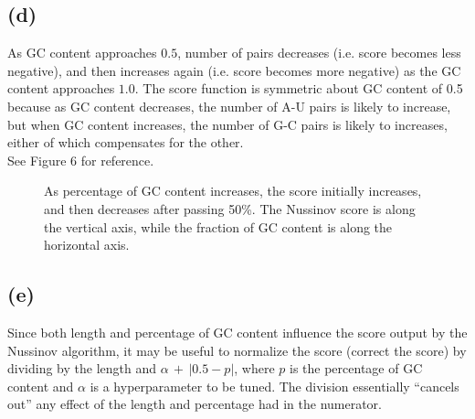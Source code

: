 \documentclass[11pt]{article}
\begin{document}
\subsection*{(d)}
As GC content approaches $0.5$, number of pairs decreases (i.e. score
becomes less negative), and then increases again (i.e. score becomes
more negative) as the GC content approaches $1.0$. The score function
is symmetric about GC content of 0.5 because as GC content decreases,
the number of A-U pairs is likely to increase, but when GC content
increases, the number of G-C pairs is likely to increases, either
of which compensates for the other.\\

\noindent See Figure 6 for reference.

\begin{figure}[h]
\noindent{}
\caption{As percentage of GC content increases, the score initially
increases, and then decreases after passing 50\%. The Nussinov
score is along the vertical axis, while the fraction of
GC content is along the horizontal axis.}
\end{figure}

\subsection*{(e)}

Since both length and percentage of GC content influence the 
score output by the Nussinov algorithm, it may be useful to
normalize the score (correct the score) by dividing by the length
and $\alpha\,+\,|0.5 - p|$, where $p$ is the percentage of GC content
and $\alpha$ is a hyperparameter to be tuned. The division essentially
``cancels out'' any effect of the length and percentage had in the
numerator.
\end{document}
